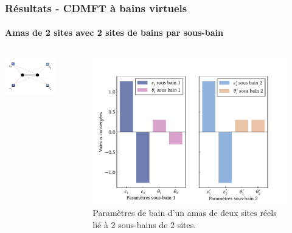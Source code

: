 \begin{frame}
    \frametitle{Résultats - CDMFT à bains virtuels}
    \framesubtitle{Amas de 2 sites avec 2 sites de bains par sous-bain}
    \begin{columns}
        \centering
        \includegraphics[scale=1.1]{figures/results/clusters/1D_2s_2vb_cluster.pdf}
        \begin{figure}
            \includegraphics[scale=0.45]{figures/results/graphs/1D_2s_2vb.pdf}
            \caption{Paramètres de bain d'un amas de deux sites réels lié à 2 sous-bains de 2 sites.}
            \label{fig: simu_2s_2vb}
        \end{figure}
    \end{columns}
\end{frame}

